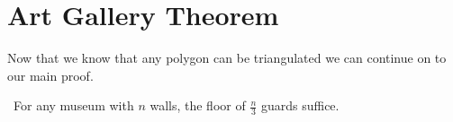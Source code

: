 \documentclass[10pt]{amsart}
\begin{document}

\section{Art Gallery Theorem}

Now that we know that any polygon can be triangulated we can continue on to our main proof.

\begin{theorem} \
    For any museum with $n$ walls, the floor of $\frac{n}{3}$ guards suffice.
\end{theorem}

\end{document}
